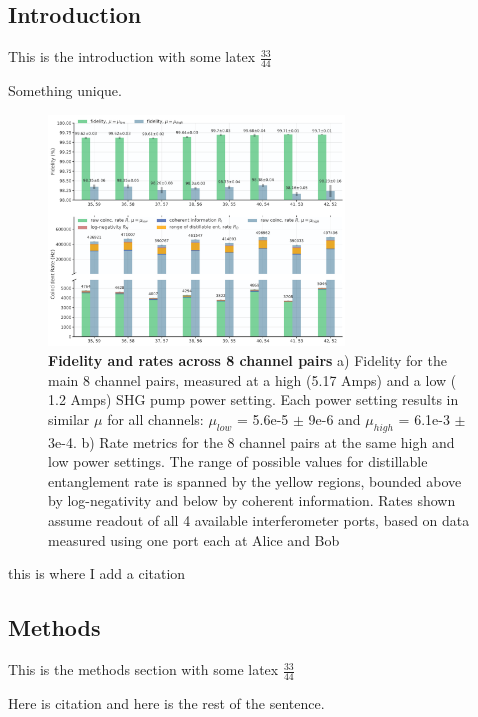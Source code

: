 \documentclass{optica-article}
\begin{document}
\subsection{Introduction}

This is the introduction with some latex \(\frac{33}{44}\)

Something unique.

\hypertarget{fig:channel_data}{%
\begin{figure}[H!]
\centering
\includegraphics[width=0.7\textwidth]{./figs_03/8ch_bar_graph_high_power_light.pdf}
\caption[{Fidelity and rates across 8 channel pairs.}]{\textbf{Fidelity and rates across 8 channel pairs} a) Fidelity for the main 8 channel pairs, measured at a high (5.17 Amps) and a low ( 1.2 Amps) SHG pump power setting. Each power setting results in similar \(\mu\) for all channels: \(\mu_{low}\) = 5.6e-5 \(\pm\) 9e-6 and \(\mu_{high}\) = 6.1e-3 \(\pm\) 3e-4. b) Rate metrics for the 8 channel pairs at the same high and low power settings. The range of possible values for distillable entanglement rate is spanned by the yellow regions, bounded above by log-negativity and below by coherent information. Rates shown assume readout of all 4 available interferometer ports, based on data measured using one port each at Alice and Bob}
\label{fig:channel_data}
\end{figure}
}

this is where I add a citation

\subsection{Methods}

This is the methods section with some latex \(\frac{33}{44}\)

Here is citation \cite{Dolinar2011Photon} and here is the rest of the sentence.


\end{document}
